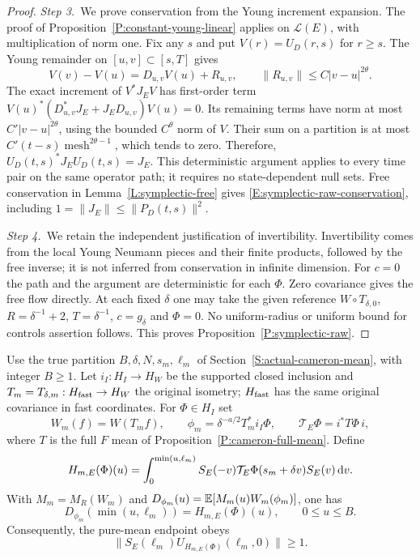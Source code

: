 \begin{proof}
  \medskip
  \noindent\textit{Step 3.~}We prove conservation from the Young increment
  expansion.
  The proof of Proposition~\ref{P:constant-young-linear} applies on
  $\mathcal{L}(E)$, with multiplication of norm one. Fix any $s$ and put $V(r) =
  U_D(r,s)$ for $r \ge s$. The Young remainder on $[u,v] \subset [s,T]$ gives
  \[
    V(v)-V(u)=D_{u,v}V(u)+R_{u,v},\qquad
    \|R_{u,v}\|\le C|v-u|^{2\theta}.
  \]
  The exact increment of $V^*J_EV$ has first-order term
  $V(u)^*(D_{u,v}^*J_E+J_ED_{u,v})V(u) = 0$. Its remaining terms have norm at
  most $C'|v-u|^{2\theta}$, using the bounded $C^\theta$ norm of $V$. Their sum
  on a partition is at most $C'(t-s)\operatorname{mesh}^{2\theta-1}$, which
  tends to zero. Therefore, $U_D(t,s)^*J_EU_D(t,s) = J_E$. This deterministic
  argument applies to every time pair on the same operator path; it requires no
  state-dependent null sets. Free conservation in Lemma~\ref{L:symplectic-free}
  gives \eqref{E:symplectic-raw-conservation}, including $1 = \|J_E\| \le
  \|P_D(t,s)\|^2$.


  \medskip
  \noindent\textit{Step 4.~}We retain the independent justification of
  invertibility.
  Invertibility comes from the local Young Neumann pieces and their finite
  products, followed by the free inverse; it is not inferred from conservation
  in infinite dimension. For $c = 0$ the path and the argument are deterministic
  for each $\Phi$. Zero covariance gives the free flow directly. At each fixed
  $\delta$ one may take the given reference $W\circ T_{\delta,0}$, $R =
  \delta^{-1}+2$, $T = \delta^{-1}$, $c = g_\delta$ and $\Phi = 0$. No
  uniform-radius or uniform bound for controls assertion follows. This proves
  Proposition~\ref{P:symplectic-raw}.
\end{proof}

\begin{proposition}\label{P:symplectic-block-mean}
  Use the true partition $B,\delta,N,s_m,\ell_m$ of
  Section~\ref{S:actual-cameron-mean}, with integer $B \ge 1$. Let $i_I:H_I \to
  H_W$ be the supported closed inclusion and $T_m = T_{\delta,m}:H_{\rm fast}
  \to H_W$ the original isometry; $H_{\rm fast}$ has the same original
  covariance in fast coordinates. For $\Phi \in H_I$ set
  \[
    W_m(f)=W(T_mf),\qquad
    \phi_m=\delta^{-a/2}T_m^*i_I\Phi,\qquad
    \mathcal{T}_E\Phi=i^*T\Phi\,i ,
  \]
  where $T$ is the full $F$ mean of Proposition~\ref{P:cameron-full-mean}.
  Define
  \begin{equation}\label{E:symplectic-block-primitive}
    H_{m,E}(\Phi)(u)=\int_0^{\min(u,\ell_m)}
    S_E(-v)\mathcal{T}_E\Phi(s_m+\delta v)S_E(v)\,\mathrm{d} v .
  \end{equation}
  With $M_m = M_R(W_m)$ and $D_{\phi_m}(u) = \mathbb{E}[M_m(u)W_m(\phi_m)]$, one has
  \begin{equation}\label{E:symplectic-block-direction}
    D_{\phi_m}(\min(u,\ell_m))=H_{m,E}(\Phi)(u),\qquad 0\le u\le B .
  \end{equation}
  Consequently, the pure-mean endpoint obeys
  \[
    \|S_E(\ell_m)U_{H_{m,E}(\Phi)}(\ell_m,0)\|\ge1 .
  \]
\end{proposition}

